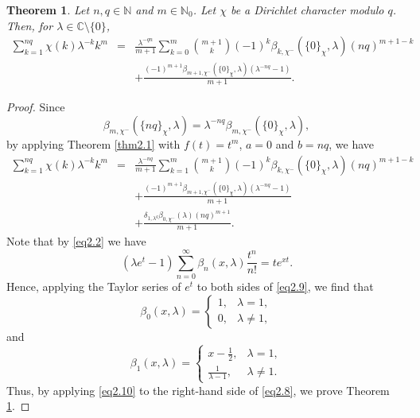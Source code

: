 \documentclass[reqno]{amsart}
\numberwithin{equation}{section}
\newtheorem{theorem}[thm]{Theorem}
\begin{document}
\begin{theorem}\label{thm2.5} Let $n,q\in\mathbb{N}$ and $m\in\mathbb{N}_{0}$. Let $\chi$ be a Dirichlet character modulo $q$. Then, for $\lambda\in\mathbb{C}\setminus\{0\}$,
\begin{eqnarray}\label{eq2.7}
\sum_{k=1}^{nq}\chi(k)\lambda^{-k}k^{m}&=&\frac{\lambda^{-qn}}{m+1}\sum_{k=0}^{m}\binom{m+1}{k}(-1)^{k}\beta_{k,\chi^{-}}(\{0\}_{\chi},\lambda)(nq)^{m+1-k}\nonumber\\
&&+\frac{(-1)^{m+1}\beta_{m+1,\chi^{-}}(\{0\}_{\chi},\lambda)(\lambda^{-nq}-1)}{m+1}.
\end{eqnarray}
\end{theorem}

\begin{proof}
Since
\begin{equation*}
\beta_{m,\chi^{-}}(\{nq\}_{\chi},\lambda)=\lambda^{-nq}\beta_{m,\chi^{-}}(\{0\}_{\chi},\lambda),
\end{equation*}
by applying Theorem \ref{thm2.1} with $f(t)=t^{m}$, $a=0$ and $b=nq$, we have
\begin{eqnarray}\label{eq2.8}
\sum_{k=1}^{nq}\chi(k)\lambda^{-k}k^{m}&=&\frac{\lambda^{-nq}}{m+1}\sum_{k=1}^{m}\binom{m+1}{k}(-1)^{k}\beta_{k,\chi^{-}}(\{0\}_{\chi},\lambda)(nq)^{m+1-k}\nonumber\\
&&+\frac{(-1)^{m+1}\beta_{m+1,\chi^{-}}(\{0\}_{\chi},\lambda)(\lambda^{-nq}-1)}{m+1}\nonumber\\
&&+\frac{\delta_{1,\lambda^{q}}\beta_{0,\chi^{-}}(\lambda)(nq)^{m+1}}{m+1}.
\end{eqnarray}
Note that by \eqref{eq2.2} we have
\begin{equation}\label{eq2.9}
(\lambda e^{t}-1)\sum_{n=0}^{\infty}\beta_{n}(x,\lambda)\frac{t^{n}}{n!}=te^{xt}.
\end{equation}
Hence, applying the Taylor series of $e^{t}$ to both sides of \eqref{eq2.9}, we find that
\begin{equation}\label{eq2.10}
\beta_{0}(x,\lambda)=\begin{cases}
1,  &\lambda=1,\\
0,  &\lambda\not=1,
\end{cases}
\end{equation}
and
\begin{equation}\label{eq2.11}
\beta_{1}(x,\lambda)=\begin{cases}
x-\frac{1}{2},  &\lambda=1,\\
\frac{1}{\lambda-1},  &\lambda\not=1.
\end{cases}
\end{equation}
Thus, by applying \eqref{eq2.10} to the right-hand side of \eqref{eq2.8}, we prove Theorem \ref{thm2.5}.
\end{proof}
\end{document}
